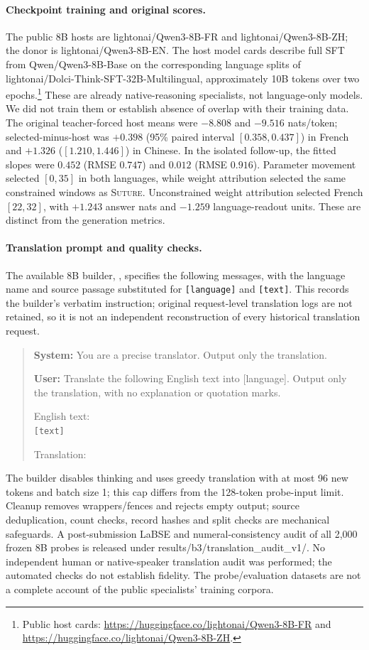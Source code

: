 \documentclass{article}
\newcommand{\artifact}[1]{\textsf{#1}}
\theoremstyle{plain}
\theoremstyle{definition}
\theoremstyle{remark}
\begin{document}
\paragraph{Checkpoint training and original scores.}
The public 8B hosts are \artifact{lightonai/Qwen3-8B-FR} and
\artifact{lightonai/Qwen3-8B-ZH}; the donor is
\artifact{lightonai/Qwen3-8B-EN}. The host model cards describe full SFT from
\artifact{Qwen/Qwen3-8B-Base} on the corresponding language splits of
\artifact{lightonai/Dolci-Think-SFT-32B-Multilingual}, approximately 10B tokens
over two epochs.\footnote{Public host cards:
\url{https://huggingface.co/lightonai/Qwen3-8B-FR} and
\url{https://huggingface.co/lightonai/Qwen3-8B-ZH}.}
These are already native-reasoning specialists, not language-only models. We
did not train them or establish absence of overlap with their training data.
The original teacher-forced host means were $-8.808$ and $-9.516$ nats/token;
selected-minus-host was $+0.398$ (95\% paired interval $[0.358,0.437]$) in
French and $+1.326$ ($[1.210,1.446]$) in Chinese. In the isolated follow-up,
the fitted slopes were $0.452$ (RMSE $0.747$) and $0.012$ (RMSE $0.916$).
Parameter movement selected $[0,35]$ in both languages, while weight attribution
selected the same constrained windows as \textsc{Suture}. Unconstrained weight
attribution selected French $[22,32]$, with $+1.243$ answer nats and $-1.259$
language-readout units. These are distinct from the generation metrics.

\paragraph{Translation prompt and quality checks.}
The available 8B builder, , specifies the
following messages, with the language name and source passage substituted for
\texttt{[language]} and \texttt{[text]}. This records the builder's verbatim
instruction; original request-level translation logs are not retained, so it
is not an independent reconstruction of every historical translation request.
\begin{quote}\small
\textbf{System:} You are a precise translator. Output only the translation.

\textbf{User:} Translate the following English text into [language]. Output only
the translation, with no explanation or quotation marks.

English text:\\
\texttt{[text]}

Translation:
\end{quote}
The builder disables thinking and uses greedy translation with at most 96 new
tokens and batch size 1; this cap differs from the 128-token probe-input limit.
Cleanup removes
wrappers/fences and rejects empty output; source deduplication, count checks,
record hashes and split checks are mechanical safeguards. A post-submission
LaBSE and numeral-consistency audit of all 2,000 frozen 8B probes is released
under \artifact{results/b3/translation\_audit\_v1/}. No independent human or native-speaker
translation audit was performed; the automated checks do not establish fidelity.
The probe/evaluation datasets are not a complete account of the public
specialists' training corpora.
\end{document}
